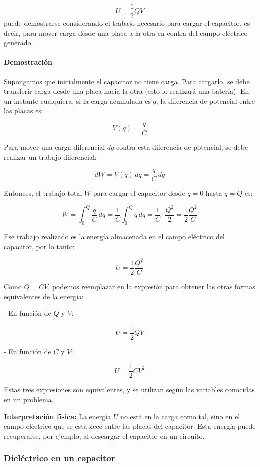 \begin{equation}
    U = \frac{1}{2} QV
\end{equation}
puede demostrarse considerando el trabajo necesario para cargar el capacitor, es decir, para mover carga desde una placa a la otra en contra del campo eléctrico generado.

\paragraph{Demostración}

Supongamos que inicialmente el capacitor no tiene carga. Para cargarlo, se debe transferir carga desde una placa hacia la otra (esto lo realizará una batería). En un instante cualquiera, si la carga acumulada es \( q \), la diferencia de potencial entre las placas es:

\[
V(q) = \frac{q}{C}
\]

Para mover una carga diferencial \( dq \) contra esta diferencia de potencial, se debe realizar un trabajo diferencial:

\[
dW = V(q) \, dq = \frac{q}{C} \, dq
\]


Entonces, el trabajo total \( W \) para cargar el capacitor desde \( q = 0 \) hasta \( q = Q \) es:

\[
W = \int_{0}^{Q} \frac{q}{C} \, dq = \frac{1}{C} \int_{0}^{Q} q \, dq = \frac{1}{C} \cdot \frac{Q^2}{2} = \frac{1}{2} \frac{Q^2}{C}
\]

Ese trabajo realizado es la energía almacenada en el campo eléctrico del capacitor, por lo tanto:

\[
U = \frac{1}{2} \frac{Q^2}{C}
\]

Como \( Q = CV \), podemos reemplazar en la expresión para obtener las otras formas equivalentes de la energía:

- En función de \( Q \) y \( V \):

\[
U = \frac{1}{2} QV
\]

- En función de \( C \) y \( V \):

\[
U = \frac{1}{2} CV^2
\]

Estas tres expresiones son equivalentes, y se utilizan según las variables conocidas en un problema.

\textbf{Interpretación física:} La energía \( U \) no está en la carga como tal, sino en el campo eléctrico que se establece entre las placas del capacitor. Esta energía puede recuperarse, por ejemplo, al descargar el capacitor en un circuito.

\subsubsection{Dieléctrico en un capacitor}

